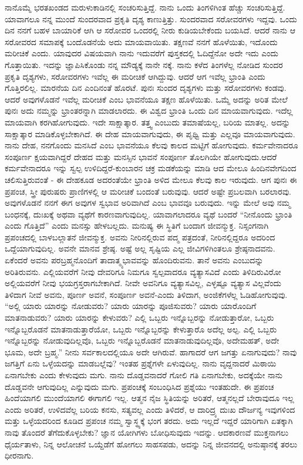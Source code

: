 ನಾನೊಮ್ಮೆ ಭರತಖಂಡದ ಮರುಳುಕಾಡಿನಲ್ಲಿ ಸಂಚರಿಸುತ್ತಿದ್ದೆ. ನಾನು ಒಂದು ತಿಂಗಳಿಗಿಂತ ಹೆಚ್ಚು ಸಂಚರಿಸುತ್ತಿದ್ದೆ. ಯಾವಾಗಲೂ ನನ್ನ ಮುಂದೆ ಸುಂದರವಾದ ಪ್ರಕೃತಿ ದೃಶ್ಯ ಕಾಣುತ್ತಿತ್ತು. ಸುಂದರವಾದ ಸರೋವರಗಳು ಇದ್ದವು. ಒಂದು ದಿನ ನನಗೆ ಬಹಳ ಬಾಯಾರಿಕೆ ಆಗಿ ಆ ಸರೋವರ ಒಂದರಲ್ಲಿ ನೀರು ಕುಡಿಯಬೇಕೆಂದು ಬಯಸಿದೆ. ಆದರೆ ನಾನು ಆ ಸರೋವರದ ಸಮಾಪಕ್ಕೆ ಬಂದೊಡನೆಯೆ ಅದು ಮಾಯವಾಯಿತು. ತಕ್ಷಣವೆ ನನಗೆ ಹೊಳೆಯಿತು, ಇದೊಂದು ಮರೀಚಿಕೆ ಎಂದು. ಯಾವುದರ ವಿಷಯವಾಗಿ ನಾನು ಇದುವರೆಗೆ ಪುಸ್ತಕದಲ್ಲಿ ಓದಿದ್ದೆನೋ ಅದೇ ಇದು ಎಂದು ಗೊತ್ತಾಯಿತು. ಇದನ್ನು ಜ್ಞಾಪಿಸಿಕೊಂಡು ನನ್ನ ಮೌಡ್ಯಕ್ಕೆ ನಾನೇ ನಕ್ಕೆ. ನಾನು ಕಳೆದ ತಿಂಗಳೆಲ್ಲ ನೋಡಿದ ಸುಂದರ ಪ್ರಕೃತಿ ದೃಶ್ಯಗಳು, ಸರೋವರಗಳು ಇವೆಲ್ಲ ಈ ಮರೀಚಿಕೆ ಆಗಿದ್ದುವು. ಆದರೆ ಆಗ ಇವೆಲ್ಲ ಭ್ರಾಂತಿ ಎಂದು ಗೊತ್ತಿರಲಿಲ್ಲ. ಮಾರನೆಯ ದಿನ ಎಂದಿನಂತೆ ಹೊರಟೆ. ಪುನಃ ಸುಂದರ ದೃಶ್ಯಗಳು ಮತ್ತು ಸರೋವರಗಳು ಕಂಡವು. ಆದರೆ ಅವುಗಳೊಡನೆ ಇವೆಲ್ಲ ಮರೀಚಿಕೆ ಎಂಬ ಭಾವನೆಯೂ ತಕ್ಷಣ ಹೊಳೆಯಿತು. ಒಮ್ಮೆ ಅದನ್ನು ಅರಿತ ಮೇಲೆ ಪುನಃ ಅದು ನಮ್ಮನ್ನು ಭ್ರಾಂತರನ್ನಾಗಿ ಮಾಡಲಾರದು. ಈ ವಿಶ್ವದ ಭ್ರಾಂತಿ ಒಂದು ದಿನ ಮಾಯವಾಗುವುದು. ಇದೆಲ್ಲ ಮಾಯವಾಗಿ ಕರಗಿಹೋಗುವುದು. ಇದೇ ಸಾಕ್ಷಾತ್ಕಾರ. ತತ್ತ್ವ ಎಂಬುದು ತಮಾಷೆಯಲ್ಲ, ಬರಿಯ ಮಾತಲ್ಲ. ಅದನ್ನು ಸಾಕ್ಷಾತ್ಕಾರ ಮಾಡಿಕೊಳ್ಳಬೇಕಾಗಿದೆ. ಈ ದೇಹ ಮಾಯವಾಗುವುದು, ಈ ಪೃಥ್ವಿ ಮತ್ತು ಎಲ್ಲವೂ ಮಾಯವಾಗುವುದು. ನಾನು ದೇಹ, ನನಗೊಂದು ಮನಸಿದೆ ಎಂಬ ಭಾವನೆಯೂ ಕೆಲವು ಕಾಲದ ಮಟ್ಟಿಗೆ ಹೋಗುವುದು. ಕರ್ಮವೇನಾದರೂ ಸಂಪೂರ್ಣ ಕ್ಷಯವಾಗಿದ್ದರೆ ದೇಹದ ಮತ್ತು ಮನಸ್ಸಿನ ಭಾವನೆ ಸಂಪೂರ್ಣ ತೊಲಗಿಯೇ ಹೋಗುವುದು.\break ಆದರೆ ಕರ್ಮವೇನಾದರೂ ಇನ್ನು ಸ್ವಲ್ಪ ಉಳಿದಿದ್ದರೆ-ಕುಂಬಾರನ ಚಕ್ರ ಮಡಕೆಯನ್ನು ಮಾಡಿ ಆದ ಮೇಲೂ ಹಿಂದಿನವೇಗದಿಂದ ಚಲಿಸುತ್ತಿರುವಂತೆ - ಈ ದೇಹಕೂಡ ಅದರಂತೆಯೇ ಭ್ರಾಂತಿ ಅಳಿದ ಮೇಲೂ ಕೆಲವು ಕಾಲ ಇರುವುದು. ಆಗ ಪುನಃ ಈ ಪ್ರಪಂಚ, ಸ್ತ್ರೀ ಪುರುಷರು ಪ್ರಾಣಿಗಳಲ್ಲಿ ಆ ಮರೀಚಿಕೆ ಬಂದಂತೆ ಬರುವುವು. ಆದರೆ ಅಷ್ಟೇ ಪ್ರಬಲವಾಗಿ ಬರಲಾರವು. ಅವುಗಳೊಡನೆ ನನಗೆ ಈಗ ಅವುಗಳ ಸ್ವಭಾವ ಅರಿವಾಗಿದೆ ಎಂಬ ಭಾವವೂ ಬರುವುದು. ಇನ್ನು ಮೇಲೆ ಅವು ನಮ್ಮ ಬಂಧನಕ್ಕೆ, ದುಃಖಕ್ಕೆ ಅಥವಾ ವ್ಯಥೆಗೆ ಕಾರಣವಾಗುವುದಿಲ್ಲ. ಯಾವಾಗಲಾದರೂ ವ್ಯಥೆ ಬಂದರೆ “ನೀನೊಂದು ಭ್ರಾಂತಿ ಎಂದು ಗೊತ್ತಿದೆ'' ಎಂದು ಮನಸ್ಸು ಹೇಳಬಲ್ಲದು. ಮನುಷ್ಯ ಈ ಸ್ಥಿತಿಗೆ ಬಂದಾಗ ಜೀವನ್ಮುಕ್ತ. ನಿಸ್ಸಂಗನಾಗಿ ಪ್ರಪಂಚದಲ್ಲಿ ಬಾಳಬಲ್ಲಾತನೆ ಜೀವನ್ಮುಕ್ತ. ಅವನು ನೀರಿನಲ್ಲಿರುವ ಪದ್ಮ ಪತ್ರದಂತೆ, ನೀರಿನಲ್ಲಿದ್ದರೂ ಅದರಿಂದ ಒದ್ದೆಯಾಗುವುದಿಲ್ಲ. ಅವನೇ ಮಾನವ ಶ್ರೇಷ್ಠ. ಅಷ್ಟೆ ಅಲ್ಲ ಸೃಷ್ಟಿಯ ಎಲ್ಲ ಜೀವಿಗಳಿಗಿಂತಲೂ ಶ್ರೇಷ್ಠನಾದವನು. ಏಕೆಂದರೆ ಅವನು ಪರಬ್ರಹ್ಮನೊಂದಿಗೆ ತಾದಾತ್ಮ್ಯಭಾವವನ್ನು ಹೊಂದಿರುವನು. ತಾನೆ ಅವನು ಎಂಬುದನ್ನು ಅರಿತಿರುವನು. ಎಲ್ಲಿಯವರೆಗೆ ನೀವು ದೇವರಿಗೂ ನಿಮಗೂ ಸ್ವಲ್ಪವಾದರೂ ವ್ಯತ್ಯಾಸವಿದೆ ಎಂದು ತಿಳಿದಿರುವಿರೋ ಅಲ್ಲಿಯವರೆಗೆ ನೀವು ಭಯಗ್ರಸ್ತರಾಗಬೇಕಾಗಿದೆ. ನೀವೇ ಅವನಿಗೂ ವ್ಯತ್ಯಾಸವಿಲ್ಲ, ಎಳ್ಳಷ್ಟೂ ವ್ಯತ್ಯಾಸ ವಿಲ್ಲವೆಂದು ತಿಳಿದಾಗ ನೀವೆ ಅವನು, ಪೂರ್ಣ ಅವನೆ, ಸಂಪೂರ್ಣ ಅವನೆ-ಎಂದು ತಿಳಿದಾಗ, ಅಂಜಿಕೆಗಳೆಲ್ಲ ಓಡಿಹೋಗುವುವು. “ಅಲ್ಲಿ ಯಾರು ಯಾರನ್ನು ನೋಡುವರು? ಯಾರು ಯಾರನ್ನು ಪೂಜಿಸುವರು? ಯಾರು ಯಾರೊಂದಿಗೆ ಮಾತನಾಡುವರು? ಯಾರು ಯಾರನ್ನು ಕೇಳುವರು? ಎಲ್ಲಿ ಒಬ್ಬರು ಇನ್ನೊಬ್ಬರನ್ನು ನೋಡುತ್ತಾರೋ, ಒಬ್ಬರು ಇನ್ನೊಬ್ಬರೊಡನೆ ಮಾತನಾಡುತ್ತಾರೆಯೋ, ಒಬ್ಬರು ಇನ್ನೊಬ್ಬರನ್ನು ಕೇಳುತ್ತಾರೊ ಅದೆಲ್ಲ ಅಲ್ಪ. ಎಲ್ಲಿ ಒಬ್ಬರು ಇನ್ನೊಬ್ಬರನ್ನು ನೋಡುವುದಿಲ್ಲವೊ, ಒಬ್ಬರು ಇನ್ನೊಬ್ಬರೊಡನೆ ಮಾತನಾಡುವುದಿಲ್ಲವೊ, ಅದೇ\break ಮಹತ್, ಅದೇ ಭೂಮ, ಅದೇ ಬ್ರಹ್ಮ.” ನೀನು ಸರ್ವಕಾಲದಲ್ಲಿಯೂ ಅದೇ ಆಗಿರುವೆ. ಹಾಗಾದರೆ ಆಗ ಜಗತ್ತು ಏನಾಗುವುದು? ನಾವು ಜಗತ್ತಿಗೆ ಏನು ಒಳ್ಳೆಯದನ್ನು ಮಾಡಬಲ್ಲೆವು? ಇಂತಹ ಪ್ರಶ್ನೆಗಳೇ ಏಳುವುದಿಲ್ಲ. ನಾನು ವೃದ್ದನಾದರೆ ಮಿಠಾಯಿ ಏನಾಗಬೇಕು ಎಂದು ಕೇಳುವುದು ಮಗು. ನಾನು ದೊಡ್ಡವನಾದರೆ ಗೋಲಿ ಗತಿ ಏನಾಗಬೇಕು, ಅದಕ್ಕೆಯೇ ನಾನು ದೊಡ್ಡವನೇ ಆಗುವುದಿಲ್ಲ ಎನ್ನುವುದು ಮಗು. ಪ್ರಪಂಚಕ್ಕೆ ಸಂಬಂಧಿಸಿದ ಪ್ರಶ್ನೆಯು ಇಂತಹುದೇ. ಈ ಪ್ರಪಂಚ ಹಿಂದೆಯಾಗಲಿ ಮುಂದೆಯಾಗಲಿ ಈಗಾಗಲಿ ಇಲ್ಲ. ಆತ್ಮನ ನೈಜ ಸ್ಥಿತಿಯನ್ನು ಅರಿತರೆ, ಆತ್ಮನಲ್ಲದೆ ಬೇರಾವುದೂ ಇಲ್ಲ ಎಂದು ಅರಿತರೆ, ಉಳಿದವೆಲ್ಲ ಬರಿಯ ಕನಸು, ಸತ್ಯವಲ್ಲ ಎಂದು ತಿಳಿದರೆ, ಆ ದಾರಿದ್ರ್ಯ ದುಃಖ ದೌರ್ಜನ್ಯ ಇವುಗಳಿಂದ ಮತ್ತು ಒಳ್ಳೆಯದರಿಂದ ಕೂಡಿದ ಪ್ರಪಂಚ ನಮ್ಮ ಸ್ವಾಸ್ಥ್ಯಕ್ಕೆ ಭಂಗ ತರದು. ಅದು ಇಲ್ಲದೆ ಇದ್ದರೆ ಯಾರಿಗಾಗಿ ಏತಕ್ಕಾಗಿ ನಾವು ತೊಂದರೆ ತೆಗೆದುಕೊಳ್ಳಬೇಕು? ಜ್ಞಾನ ಯೋಗಿಗಳು ಬೋಧಿಸುವುದು ಇದನ್ನು. ಆದಕಾರಣವೆ ಮುಕ್ತನಾಗಲು ಧೈರ್ಯತಾಳು, ನಿನ್ನ ಆಲೋಚನೆ ಒಯ್ದೆಡೆಗೆ ಹೋಗಲು ಸಾಹಸಪಡು, ಅದನ್ನು ನಿನ್ನ ಜೀವನದಲ್ಲಿ ಅನುಷ್ಠಾನಕ್ಕೆ ತರಲು ಧೀರನಾಗು. 